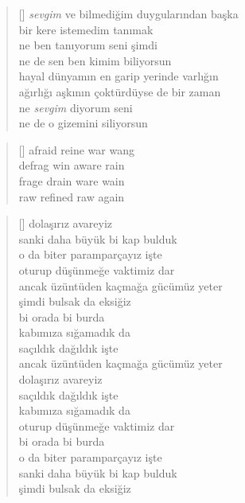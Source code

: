 \documentclass[10pt, openright, twoside]{memoir}
\theoremstyle{definition}
\begin{document}
\vspace*{\fill}
%
\newpage
{}
\vspace*{\fill}
\begin{verse}[\versewidth]
  \textit{sevgim} ve bilmediğim duygularından başka \\
  bir kere istemedim tanımak \\
  ne ben tanıyorum seni şimdi \\
  ne de sen ben kimim biliyorsun \\
  hayal dünyamın en garip yerinde varlığın \\
  ağırlığı aşkının çoktürdüyse de bir zaman \\
  ne \textit{sevgim} diyorum seni \\
  ne de o gizemini siliyorsun \\
\end{verse}
\vspace*{\fill}
%
\newpage
{}
\vspace*{\fill}
\settowidth{\versewidth}{afraid reine war wang}
\begin{verse}[\versewidth]
  afraid reine war wang \\
  defrag win aware rain \\
  frage drain ware wain \\
  raw refined raw again \\
\end{verse}
\vspace*{\fill}
%
\newpage
{}
\vspace*{\fill}
\settowidth{\versewidth}{ancak üzüntüden kaçmağa gücümüz yeter}
\begin{verse}[\versewidth]
  dolaşırız avareyiz \\
  sanki daha büyük bi kap bulduk \\
  o da biter paramparçayız işte \\
  oturup düşünmeğe vaktimiz dar \\
  ancak üzüntüden kaçmağa gücümüz yeter \\
  şimdi bulsak da eksiğiz \\
  bi orada bi burda \\
  kabımıza sığamadık da \\
  saçıldık dağıldık işte \\
  ancak üzüntüden kaçmağa gücümüz yeter \\
  dolaşırız avareyiz \\
  saçıldık dağıldık işte \\
  kabımıza sığamadık da \\
  oturup düşünmeğe vaktimiz dar \\
  bi orada bi burda \\
  o da biter paramparçayız işte \\
  sanki daha büyük bi kap bulduk \\
  şimdi bulsak da eksiğiz \\
\end{verse}
\end{document}
